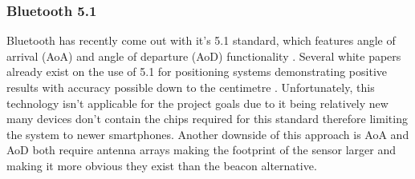 \subsubsection{Bluetooth 5.1}
Bluetooth has recently come out with it’s 5.1 standard, which features angle of arrival (AoA) and angle of departure (AoD) functionality \citetemp. Several white papers already exist on the use of 5.1 for positioning systems demonstrating positive results with accuracy possible down to the centimetre \citetemp. Unfortunately, this technology isn't applicable for the project goals due to it being relatively new many devices don't contain the chips required for this standard \citetemp therefore limiting the system to newer smartphones. Another downside of this approach is AoA and AoD both require antenna arrays making the footprint of the sensor larger and making it more obvious they exist than the beacon alternative.